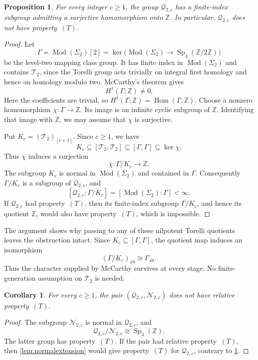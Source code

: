 \documentclass[11pt,a4paper]{article}
\newtheorem{proposition}[theorem]{Proposition}
\newtheorem{corollary}[theorem]{Corollary}
\theoremstyle{definition}
\newcommand{\Z}{\mathbb Z}
\newcommand{\Mod}{\operatorname{Mod}}
\newcommand{\Sp}{\operatorname{Sp}}
\newcommand{\Hom}{\operatorname{Hom}}
\newcommand{\ab}{\mathrm{ab}}
\newcommand{\rt}{(T)}
\begin{document}
\begin{proposition}\label{prop:genustwo}
For every integer \(c\ge1\), the group \(\mathcal{Q}_{2,c}\) has a
finite-index subgroup admitting a surjective homomorphism onto
\(\Z\). In particular, \(\mathcal{Q}_{2,c}\) does not have
property~\(\rt\).
\end{proposition}
\begin{proof}
Let
\[
 \Gamma=\Mod(\Sigma_2)[2]
 =\ker\bigl(\Mod(\Sigma_2)\longrightarrow\Sp_4(\Z/2\Z)\bigr)
\]
be the level-two mapping class group. It has finite index in
\(\Mod(\Sigma_2)\) and contains \(\mathcal{T}_2\), since the Torelli group acts
trivially on integral first homology and hence on homology modulo
two. McCarthy's theorem \cite[Theorem~B; Theorem~2.1]{McCarthy}
gives
\[
 H^1(\Gamma;\Z)\ne0.
\]
Here the coefficients are trivial, so
\(H^1(\Gamma;\Z)=\Hom(\Gamma,\Z)\). Choose a nonzero
homomorphism \(\chi:\Gamma\to\Z\). Its image is an infinite
cyclic subgroup of \(\Z\). Identifying that image with \(\Z\),
we may assume that \(\chi\) is surjective.

Put \(K_c=(\mathcal{T}_2)_{[c+1]}\). Since \(c\ge1\), we have
\[
 K_c\subseteq[\mathcal{T}_2,\mathcal{T}_2]
     \subseteq[\Gamma,\Gamma]
     \subseteq\ker\chi.
\]
Thus \(\chi\) induces a surjection
\[
 \bar\chi:\Gamma/K_c\longrightarrow\Z.
\]
The subgroup \(K_c\) is normal in \(\Mod(\Sigma_2)\) and contained in
\(\Gamma\). Consequently \(\Gamma/K_c\) is a subgroup of
\(\mathcal{Q}_{2,c}\), and
\[
 [\mathcal{Q}_{2,c}:\Gamma/K_c]=[\Mod(\Sigma_2):\Gamma]<\infty.
\]
If \(\mathcal{Q}_{2,c}\) had property~\(\rt\), then its finite-index
subgroup \(\Gamma/K_c\), and hence its quotient \(\Z\), would
also have property~\(\rt\), which is impossible.
\end{proof}

The argument shows why passing to any of these nilpotent Torelli
quotients leaves the obstruction intact. Since
\(K_c\subseteq[\Gamma,\Gamma]\), the quotient map induces an
isomorphism
\[
 (\Gamma/K_c)_{\ab}\cong\Gamma_{\ab}.
\]
Thus the character supplied by McCarthy survives at every stage.
No finite-generation assumption on \(\mathcal{T}_2\) is needed.

\begin{corollary}\label{cor:genustworelative}
For every \(c\ge1\), the pair \((\mathcal{Q}_{2,c},\mathcal{N}_{2,c})\) does not
have relative property~\(\rt\).
\end{corollary}
\begin{proof}
The subgroup \(\mathcal{N}_{2,c}\) is normal in \(\mathcal{Q}_{2,c}\), and
\[
 \mathcal{Q}_{2,c}/\mathcal{N}_{2,c}\cong\Sp_4(\Z).
\]
The latter group has property~\(\rt\). If the pair had relative
property~\(\rt\), then \cref{lem:normalextension} would give
property~\(\rt\) for \(\mathcal{Q}_{2,c}\), contrary to
\cref{prop:genustwo}.
\end{proof}
\end{document}
